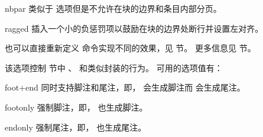 \begin{optionlist}
\begin{valuelist}
\item[nbpar] %
类似于  选项但是不允许在块的边界和条目内部分页。

\item[ragged] %
插入一个小的负惩罚项以鼓励在块的边界处断行并设置左对齐。

\end{valuelist}


也可以直接重新定义  命令实现不同的效果，见   节。
更多信息见  节。



该选项控制  节中 、 和类似封装的行为。
可用的选项值有：

\begin{valuelist}
\item[foot+end] %
同时支持脚注和尾注，即， 会生成脚注而  会生成尾注。
\item[footonly] %
强制脚注，即， 也生成脚注。
\item[endonly] %
强制尾注，即， 也生成尾注。
\end{valuelist}




\end{optionlist}
